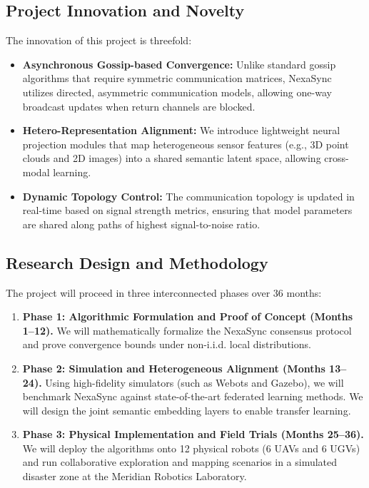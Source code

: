 \subsection{Project Innovation and Novelty}
The innovation of this project is threefold:
\begin{itemize}[leftmargin=*,noitemsep]
    \item \textbf{Asynchronous Gossip-based Convergence:} Unlike standard gossip algorithms that require symmetric communication matrices, NexaSync utilizes directed, asymmetric communication models, allowing one-way broadcast updates when return channels are blocked.
    \item \textbf{Hetero-Representation Alignment:} We introduce lightweight neural projection modules that map heterogeneous sensor features (e.g., 3D point clouds and 2D images) into a shared semantic latent space, allowing cross-modal learning.
    \item \textbf{Dynamic Topology Control:} The communication topology is updated in real-time based on signal strength metrics, ensuring that model parameters are shared along paths of highest signal-to-noise ratio.
\end{itemize}

\subsection{Research Design and Methodology}
The project will proceed in three interconnected phases over 36 months:
\begin{enumerate}[leftmargin=*,noitemsep]
    \item \textbf{Phase 1: Algorithmic Formulation and Proof of Concept (Months 1--12).} We will mathematically formalize the NexaSync consensus protocol and prove convergence bounds under non-i.i.d. local distributions.
    \item \textbf{Phase 2: Simulation and Heterogeneous Alignment (Months 13--24).} Using high-fidelity simulators (such as Webots and Gazebo), we will benchmark NexaSync against state-of-the-art federated learning methods. We will design the joint semantic embedding layers to enable transfer learning.
    \item \textbf{Phase 3: Physical Implementation and Field Trials (Months 25--36).} We will deploy the algorithms onto 12 physical robots (6 UAVs and 6 UGVs) and run collaborative exploration and mapping scenarios in a simulated disaster zone at the Meridian Robotics Laboratory.
\end{enumerate}
